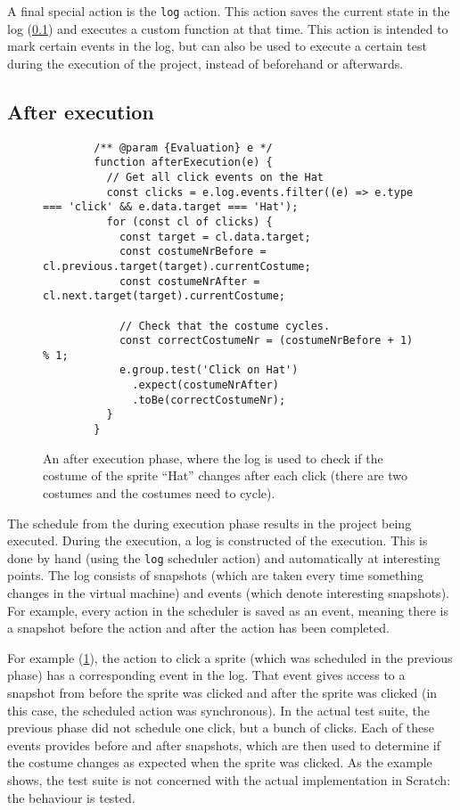 \documentclass[../main]{subfiles}
\begin{document}
A final special action is the \texttt{log} action.
This action saves the current state in the log (\cref{subsec:after-execution}) and executes a custom function at that time.
This action is intended to mark certain events in the log, but can also be used to execute a certain test during the execution of the project, instead of beforehand or afterwards.

\subsection{After execution}\label{subsec:after-execution}

\begin{figure}
    \begin{verbatim}
        /** @param {Evaluation} e */
        function afterExecution(e) {
          // Get all click events on the Hat
          const clicks = e.log.events.filter((e) => e.type === 'click' && e.data.target === 'Hat');
          for (const cl of clicks) {
            const target = cl.data.target;
            const costumeNrBefore = cl.previous.target(target).currentCostume;
            const costumeNrAfter = cl.next.target(target).currentCostume;

            // Check that the costume cycles.
            const correctCostumeNr = (costumeNrBefore + 1) % 1;
            e.group.test('Click on Hat')
              .expect(costumeNrAfter)
              .toBe(correctCostumeNr);
          }
        }
    \end{verbatim}
    \caption{An after execution phase, where the log is used to check if the costume of the sprite ``Hat'' changes after each click (there are two costumes and the costumes need to cycle).}\label{fig:itch-hat-costum-change}
\end{figure}

The schedule from the during execution phase results in the project being executed.
During the execution, a log is constructed of the execution.
This is done by hand (using the \texttt{log} scheduler action) and automatically at interesting points.
The log consists of snapshots (which are taken every time something changes in the virtual machine) and events (which denote interesting snapshots).
For example, every action in the scheduler is saved as an event, meaning there is a snapshot before the action and after the action has been completed.

For example (\cref{fig:itch-hat-costum-change}), the action to click a sprite (which was scheduled in the previous phase) has a corresponding event in the log.
That event gives access to a snapshot from before the sprite was clicked and after the sprite was clicked (in this case, the scheduled action was synchronous).
In the actual test suite, the previous phase did not schedule one click, but a bunch of clicks.
Each of these events provides before and after snapshots, which are then used to determine if the costume changes as expected when the sprite was clicked.
As the example shows, the test suite is not concerned with the actual implementation in Scratch: the behaviour is tested.
\end{document}
